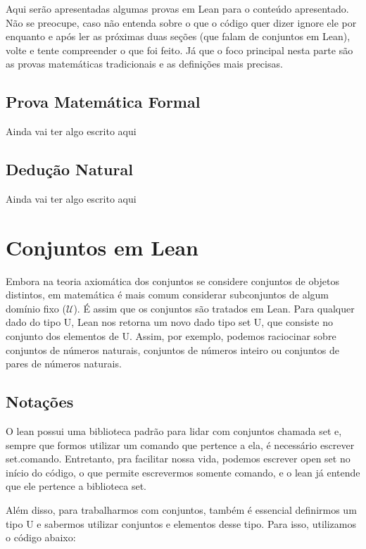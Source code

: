 Aqui serão apresentadas algumas provas em Lean para o conteúdo apresentado. Não se preocupe, caso não entenda sobre o que o código quer dizer ignore ele por enquanto e após ler as próximas duas seções (que falam de conjuntos em Lean), volte e tente compreender o que foi feito. Já que o foco principal nesta parte são as provas matemáticas tradicionais e as definições mais precisas.

\subsection{Prova Matemática Formal}
Ainda vai ter algo escrito aqui

\subsection{Dedução Natural}
Ainda vai ter algo escrito aqui

\section{Conjuntos em Lean}
Embora na teoria axiomática dos conjuntos se considere conjuntos de objetos distintos, em matemática é mais comum considerar subconjuntos de algum domínio fixo ($\mathcal U $). É assim que os conjuntos são tratados em Lean. Para qualquer dado do tipo {\selectfont U}, Lean nos retorna um novo dado tipo {\selectfont set U}, que consiste no conjunto dos elementos de {\selectfont U}. Assim, por exemplo, podemos raciocinar sobre conjuntos de números naturais, conjuntos de números inteiro ou conjuntos de pares de números naturais.

\subsection{Notações}
O lean possui uma biblioteca padrão para lidar com conjuntos chamada {\selectfont set} e, sempre que formos utilizar um comando que pertence a ela, é necessário escrever {\selectfont set.comando}. Entretanto, pra facilitar nossa vida, podemos escrever {\selectfont open set} no início do código, o que permite escrevermos somente {\selectfont comando}, e o lean já entende que ele pertence a biblioteca set.

Além disso, para trabalharmos com conjuntos, também é essencial definirmos um tipo {\selectfont U} e sabermos utilizar conjuntos e elementos desse tipo. Para isso, utilizamos o código abaixo:

